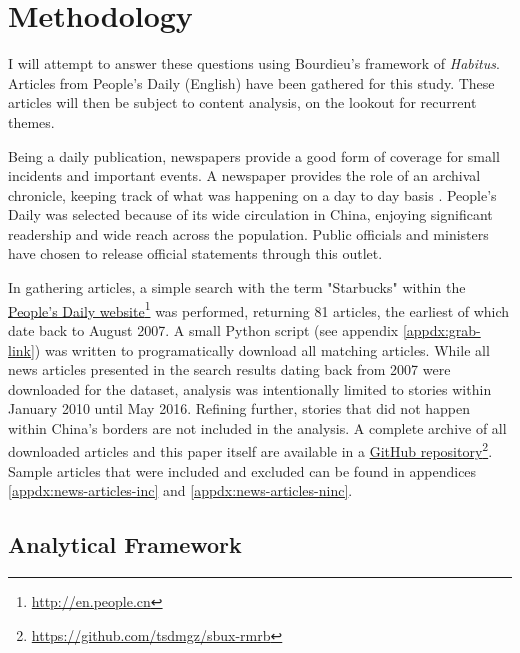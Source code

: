 \chapter{Methodology}\label{chap:methodology}

I will attempt to answer these questions using Bourdieu's framework of
\emph{Habitus}. Articles from People's Daily (English) have been gathered for
this study. These articles will then be subject to content analysis, on the
lookout for recurrent themes.

Being a daily publication, newspapers provide a good form of coverage for small
incidents and important events. A newspaper provides the role of an archival
chronicle, keeping track of what was happening on a day to day basis
\autocite{martin_examining_1996}. People's Daily was selected because of its
wide circulation in China, enjoying significant readership and wide reach across
the population. Public officials and ministers have chosen to release official
statements through this outlet.

In gathering articles, a simple search with the term "Starbucks" within the
\href{http://en.people.cn}{People's Daily
website}\footnote{\url{http://en.people.cn}} was performed, returning 81
articles, the earliest of which date back to August 2007. A small Python script
(see appendix \autoref{appdx:grab-link}) was written to programatically download
all matching articles. While all news articles presented in the search results
dating back from 2007 were downloaded for the dataset, analysis was
intentionally limited to stories within January 2010 until May 2016. Refining
further, stories that did not happen within China's borders are not included in
the analysis. A complete archive of all downloaded articles and this paper
itself are available in a \href{https://github.com/tsdmgz/sbux-rmrb}{GitHub
repository}\footnote{\url{https://github.com/tsdmgz/sbux-rmrb}}. Sample articles
that were included and excluded can be found in appendices
\ref{appdx:news-articles-inc} and \ref{appdx:news-articles-ninc}.

\section{Analytical Framework}\label{sec:analyticf}


